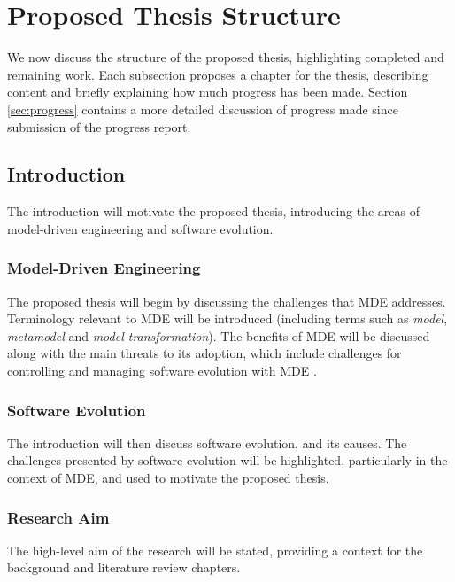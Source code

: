 

\section{Proposed Thesis Structure}
We now discuss the structure of the proposed thesis, highlighting completed and remaining work. Each subsection proposes a chapter for the thesis, describing content and briefly explaining how much progress has been made. Section \ref{sec:progress} contains a more detailed discussion of progress made since submission of the progress report.


\subsection{Introduction}
The introduction will motivate the proposed thesis, introducing the areas of model-driven engineering and software evolution.

\subsubsection{Model-Driven Engineering}
The proposed thesis will begin by discussing the challenges that MDE addresses. Terminology relevant to MDE will be introduced (including terms such as \emph{model}, \emph{metamodel} and \emph{model transformation}). The benefits of MDE will be discussed along with the main threats to its adoption, which include challenges for controlling and managing software evolution with MDE \cite{mens07softwareevolution}.

\subsubsection{Software Evolution}
The introduction will then discuss software evolution, and its causes. The challenges presented by software evolution will be highlighted, particularly in the context of MDE, and used to motivate the proposed thesis.

\subsubsection{Research Aim}
The high-level aim of the research will be stated, providing a context for the background and literature review chapters. 

